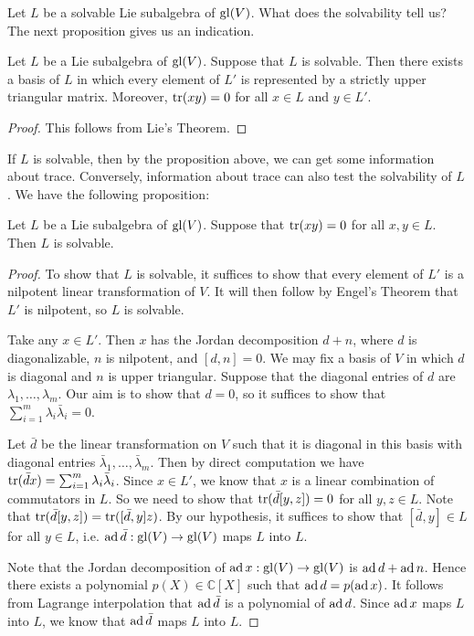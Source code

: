 Let $L$ be a solvable Lie subalgebra of $\mathrm{gl}(V)$. What does the solvability tell us? The next proposition gives us an indication.

\begin{prop}\label{solvable_subalgebra_tr}
    Let $L$ be a Lie subalgebra of $\mathrm{gl}(V)$. Suppose that $L$ is solvable. Then there exists a basis of $L$ in which every element of $L'$ is represented by a strictly upper triangular matrix. Moreover, $\operatorname{tr} (xy)=0$ for all $x\in L$ and $y\in L'$.
\end{prop}

\begin{proof}
    This follows from Lie's Theorem.
\end{proof}

If $L$ is solvable, then by the proposition above, we can get some information about trace. Conversely, information about trace can also test the solvability of $L$. We have the following proposition:

\begin{prop}\label{tr_L_solvable}
    Let $L$ be a Lie subalgebra of $\mathrm{gl}(V)$. Suppose that $\operatorname{tr}(xy)=0$ for all $x,y\in L$. Then $L$ is solvable.
\end{prop}

\begin{proof}
    To show that $L$ is solvable, it suffices to show that every element of $L'$ is a nilpotent linear transformation of $V$. It will then follow by Engel's Theorem that $L'$ is nilpotent, so $L$ is solvable.

    Take any $x\in L'$. Then $x$ has the Jordan decomposition $d+n$, where $d$ is diagonalizable, $n$ is nilpotent, and $[d,n]=0$. We may fix a basis of $V$ in which $d$ is diagonal and $n$ is upper triangular. Suppose that the diagonal entries of $d$ are $\lambda_1,\ldots,\lambda_m$. Our aim is to show that $d=0$, so it suffices to show that $\sum_{i=1}^{m}\lambda_i\bar\lambda_i=0$.

    Let $\bar{d}$ be the linear transformation on $V$ such that it is diagonal in this basis with diagonal entries $\bar{\lambda}_1,\ldots,\bar{\lambda}_m$. Then by direct computation we have $\operatorname{tr}(\bar{d}x)=\sum_{i=1}^{m}\lambda_i\bar\lambda_i$. Since $x\in L'$, we know that $x$ is a linear combination of commutators in $L$. So we need to show that $\operatorname{tr}(\bar{d}[y,z])=0$ for all $y,z\in L$. Note that $\operatorname{tr}(\bar{d}[y,z])=\operatorname{tr}([\bar{d},y]z)$. By our hypothesis, it suffices to show that $[\bar{d},y]\in L$ for all $y\in L$, i.e. $\operatorname{ad} \bar{d}:\mathrm{gl}(V)\to \mathrm{gl}(V)$ maps $L$ into $L$. 

    Note that the Jordan decomposition of $\operatorname{ad} x:\mathrm{gl}(V)\to \mathrm{gl}(V)$ is $\operatorname{ad} d+\operatorname{ad} n$. Hence there exists a polynomial $p(X)\in\mathbb{C}[X]$ such that $\operatorname{ad} d=p(\operatorname{ad} x)$. It follows from Lagrange interpolation that $\operatorname{ad} \bar{d}$ is a polynomial of $\operatorname{ad} d$. Since $\operatorname{ad} x$ maps $L$ into $L$, we know that $\operatorname{ad} \bar{d}$ maps $L$ into $L$.
\end{proof}

